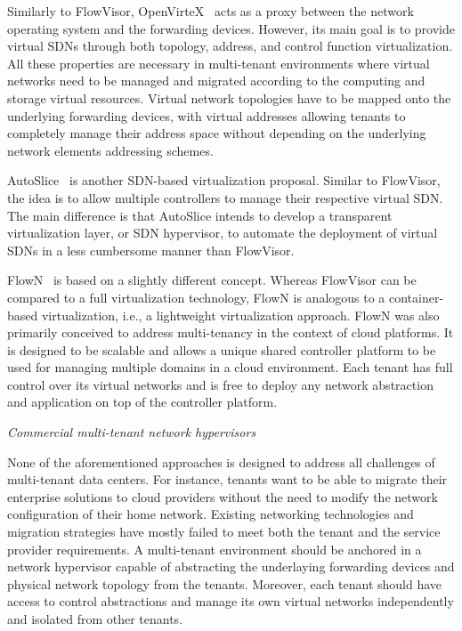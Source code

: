 Similarly to FlowVisor, OpenVirteX~\cite{al-shabibi2014} acts as a proxy between the network operating system and the forwarding 
devices. However, its main goal is to provide virtual SDNs through both topology, address, and control function
virtualization. 
All these properties are necessary in multi-tenant environments where virtual networks 
need to be managed and migrated according to the computing and storage virtual resources. Virtual network 
topologies have to be mapped onto the underlying forwarding devices, with virtual addresses allowing tenants 
to completely manage their address space without depending on the underlying network elements addressing schemes.

AutoSlice~\cite{bozakov2012} is another SDN-based virtualization proposal. Similar to FlowVisor, the idea is to 
allow multiple controllers to manage their respective virtual SDN.
The main difference is that AutoSlice intends to develop a transparent virtualization layer, or SDN hypervisor, 
to automate the deployment of virtual SDNs in a less cumbersome manner than FlowVisor.

FlowN~\cite{drutskoy2012,drutskoy2013} is based on a slightly different concept. Whereas FlowVisor can be compared to a full virtualization technology, FlowN 
is analogous to a container-based virtualization, i.e., a lightweight virtualization approach. FlowN 
was also primarily conceived to address multi-tenancy in the context of cloud platforms. It is designed to 
be scalable and allows a unique shared controller platform to be used for managing multiple domains 
in a cloud environment. Each tenant has full control over its virtual networks and is free to deploy 
any network abstraction and application on top of the controller platform.


\vspace{2mm}
\noindent \textit{Commercial multi-tenant network hypervisors}

None of the aforementioned approaches is designed to address all challenges of multi-tenant 
data centers. For instance, tenants want to be able to migrate their enterprise solutions to cloud 
providers without the need to modify the network configuration of their home network. Existing 
networking technologies and migration strategies have mostly failed to meet both the tenant and the 
service provider requirements.
A multi-tenant environment should be anchored in a network hypervisor capable of abstracting the 
underlaying forwarding devices and physical network topology from the tenants. Moreover, each tenant 
should have access to control abstractions and manage its own virtual networks independently and 
isolated from other tenants.

